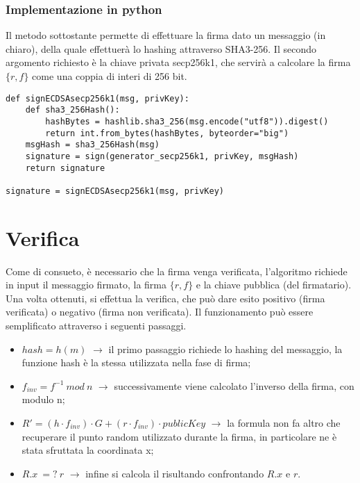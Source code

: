 \subsubsection{Implementazione in python}

Il metodo sottostante permette di effettuare la firma dato un messaggio (in chiaro), della quale effettuerà lo hashing attraverso SHA3-256. 
Il secondo argomento richiesto è la chiave privata secp256k1, che servirà a calcolare la firma $\{r, f\}$ come una coppia di interi di 256 bit. 

\begin{lstlisting}
def signECDSAsecp256k1(msg, privKey):
	def sha3_256Hash():
		hashBytes = hashlib.sha3_256(msg.encode("utf8")).digest()
		return int.from_bytes(hashBytes, byteorder="big")
	msgHash = sha3_256Hash(msg)
	signature = sign(generator_secp256k1, privKey, msgHash)
	return signature

signature = signECDSAsecp256k1(msg, privKey)
\end{lstlisting}

\newpage

\section{Verifica}

Come di consueto, è necessario che la firma venga verificata, l'algoritmo richiede in input il messaggio firmato, la firma $\{r, f\}$ e la chiave pubblica (del firmatario). Una volta ottenuti, si effettua la verifica, che può dare esito positivo (firma verificata) o negativo (firma non verificata). Il funzionamento può essere semplificato attraverso i seguenti passaggi.

\begin{itemize}
	\item $hash = h(m)$ $\rightarrow$ il primo passaggio richiede lo hashing del messaggio, la funzione hash è la stessa utilizzata nella fase di firma;
	\item $f_{inv} = f^{-1} \: mod \: n$ $\rightarrow$ successivamente viene calcolato l'inverso della firma, con modulo n;
	\item $R' = (h \cdot f_{inv}) \cdot G + (r \cdot f_{inv}) \cdot publicKey$ $\rightarrow$ la formula non fa altro che recuperare il punto random utilizzato durante la firma, in particolare ne è stata sfruttata la coordinata x;
	\item $R.x \: =? \: r$ $\rightarrow$ infine si calcola il risultando confrontando $R.x$ e $r$.
\end{itemize}

